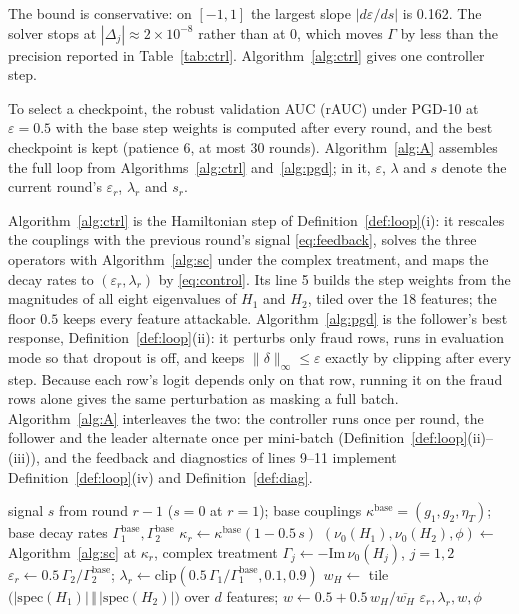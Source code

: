 \documentclass[conference]{IEEEtran}
\begin{document}
The bound is conservative: on $[-1,1]$ the largest slope $|d\varepsilon/ds|$ is 0.162. The solver stops at $|\Delta_j|\approx2{\times}10^{-8}$ rather than at 0, which moves $\Gamma$ by less than the precision reported in Table~\ref{tab:ctrl}. Algorithm~\ref{alg:ctrl} gives one controller step.

To select a checkpoint, the robust validation AUC (rAUC) under PGD-10 at $\varepsilon{=}0.5$ with the base step weights is computed after every round, and the best checkpoint is kept (patience 6, at most 30 rounds). Algorithm~\ref{alg:A} assembles the full loop from Algorithms~\ref{alg:ctrl} and~\ref{alg:pgd}; in it, $\varepsilon$, $\lambda$ and $s$ denote the current round's $\varepsilon_r$, $\lambda_r$ and $s_r$.

Algorithm~\ref{alg:ctrl} is the Hamiltonian step of Definition~\ref{def:loop}(i): it rescales the couplings with the previous round's signal \eqref{eq:feedback}, solves the three operators with Algorithm~\ref{alg:sc} under the complex treatment, and maps the decay rates to $(\varepsilon_r,\lambda_r)$ by \eqref{eq:control}. Its line 5 builds the step weights from the magnitudes of all eight eigenvalues of $H_1$ and $H_2$, tiled over the 18 features; the floor $0.5$ keeps every feature attackable. Algorithm~\ref{alg:pgd} is the follower's best response, Definition~\ref{def:loop}(ii): it perturbs only fraud rows, runs in evaluation mode so that dropout is off, and keeps $\|\delta\|_\infty\le\varepsilon$ exactly by clipping after every step. Because each row's logit depends only on that row, running it on the fraud rows alone gives the same perturbation as masking a full batch. Algorithm~\ref{alg:A} interleaves the two: the controller runs once per round, the follower and the leader alternate once per mini-batch (Definition~\ref{def:loop}(ii)--(iii)), and the feedback and diagnostics of lines 9--11 implement Definition~\ref{def:loop}(iv) and Definition~\ref{def:diag}.

\begin{algorithm}[t]
\caption{Hamiltonian controller step (round $r$, Study~A)}\label{alg:ctrl}
\small
\begin{algorithmic}[1]
\Require signal $s$ from round $r-1$ ($s=0$ at $r=1$); base couplings $\kappa^{\mathrm{base}}=(g_1,g_2,\eta_T)$; base decay rates $\Gamma_1^{\mathrm{base}},\Gamma_2^{\mathrm{base}}$
\State $\kappa_r\gets\kappa^{\mathrm{base}}(1-0.5\,s)$ 
\State $(\nu_0(H_1),\nu_0(H_2),\phi)\gets$ Algorithm~\ref{alg:sc} at $\kappa_r$, complex treatment
\State $\Gamma_j\gets-\mathrm{Im}\,\nu_0(H_j)$, $j=1,2$
\State $\varepsilon_r\gets0.5\,\Gamma_2/\Gamma_2^{\mathrm{base}}$; $\lambda_r\gets\mathrm{clip}(0.5\,\Gamma_1/\Gamma_1^{\mathrm{base}},0.1,0.9)$ 
\State $w_H\gets$ tile$\big(|\mathrm{spec}(H_1)|\,\Vert\,|\mathrm{spec}(H_2)|\big)$ over $d$ features; $w\gets0.5+0.5\,w_H/\overline{w_H}$
\State \Return $\varepsilon_r,\lambda_r,w,\phi$ 
\end{algorithmic}
\end{algorithm}
\end{document}
